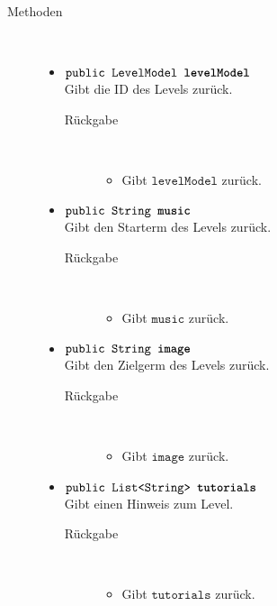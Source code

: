 \begin{description}
\item[Methoden] \hfill \\
	\vspace{-.8cm}
	\begin{itemize}
		\item $\texttt{public LevelModel \textbf{levelModel}}$ \\ Gibt die ID des Levels zurück.
		\begin{description}
			\item[Rückgabe] \hfill \\
			\vspace{-.8cm}
			\begin{itemize}
				\item Gibt $\texttt{levelModel}$ zurück.
			\end{itemize}
			\end{description}
		
		\item $\texttt{public String \textbf{music}}$ \\ Gibt den Starterm des Levels zurück.
		\begin{description}
			\item[Rückgabe] \hfill \\
			\vspace{-.8cm}
			\begin{itemize}
				\item Gibt $\texttt{music}$ zurück.
			\end{itemize}
			\end{description}
			
		\item $\texttt{public String \textbf{image}}$ \\ Gibt den Zielgerm des Levels zurück.
		\begin{description}
			\item[Rückgabe] \hfill \\
			\vspace{-.8cm}
			\begin{itemize}
				\item Gibt $\texttt{image}$ zurück.
			\end{itemize}
			\end{description}
			
		\item $\texttt{public List<String> \textbf{tutorials}}$ \\ Gibt einen Hinweis zum Level.
		\begin{description}
			\item[Rückgabe] \hfill \\
			\vspace{-.8cm}
			\begin{itemize}
				\item Gibt $\texttt{tutorials}$ zurück.
			\end{itemize}
			\end{description}
			

\end{itemize}
\end{description}
